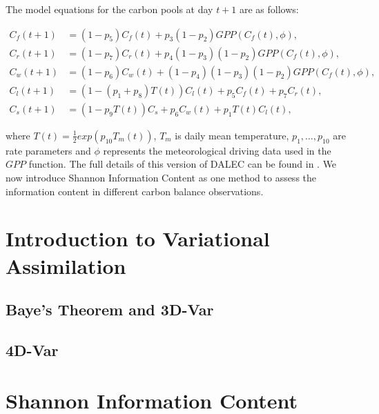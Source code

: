 \documentclass[11pt]{article}
\begin{document}
The model equations for the carbon pools at day $t+1$ are as follows:

\begin{align}
C_f(t+1)&=(1-p_5)C_f(t)+p_3(1-p_2)GPP(C_f(t),\phi),
\\C_r(t+1)&=(1-p_7)C_r(t)+p_4(1-p_3)(1-p_2)GPP(C_f(t),\phi), 
\\C_w(t+1)&=(1-p_6)C_w(t)+(1-p_4)(1-p_3)(1-p_2)GPP(C_f(t),\phi), 
\\C_l(t+1)&=(1-(p_1+p_8)T(t))C_l(t)+p_5C_f(t)+p_7C_r(t), 
\\C_s(t+1)&=(1-p_9T(t))C_s+p_6C_w(t)+p_1T(t)C_l(t),
\end{align}

where $T(t)=\frac{1}{2}exp(p_{10}T_m(t))$, $T_m$ is daily mean temperature, $p_1,\ldots,p_{10}$ are rate parameters and $\phi$ represents the meteorological driving data used in the $GPP$ function. The full details of this version of DALEC can be found in \cite{williams2005improved}. We now introduce Shannon Information Content as one method to assess the information content in different carbon balance observations. 

\section{Introduction to Variational Assimilation}

\subsection{Baye's Theorem and 3D-Var}

\subsection{4D-Var}

\section{Shannon Information Content}
\end{document}
